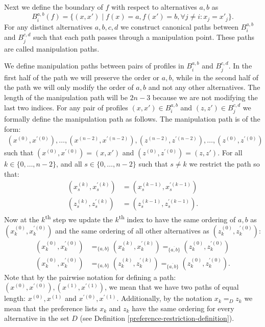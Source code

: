 	Next we define the boundary of $f$ with respect to alternatives $a, b$ as
	\[
		B^{a,b}_i(f) = \{(x, x') \mid f(x) = a, f(x') = b, \forall j \neq i: x_j = x'_j\}.
	\]
	For any distinct alternatives $a, b, c, d$ we construct canonical paths between $B^{a,b}_i$ and $B^{c,d}_j$ such that each path passes through a manipulation point. These paths are called manipulation paths.

	We define manipulation paths between pairs of profiles in $B^{a,b}_i$ and $B^{c,d}_j$. In the first half of the path we will preserve the order or $a, b$, while in the second half of the path we will only modify the order of $a, b$ and not any other alternatives. The length of the manipulation path will be $2n - 3$ because we are not modifying the last two indices. For any pair of profiles $(x, x') \in B^{a,b}_i$ and $(z, z') \in B^{c,d}_j$ we formally define the manipulation path as follows. The manipulation path is of the form:
	\begin{align*}
		(x^{(0)}, x^{\prime(0)}), \ldots, (x^{(n - 2)}, x^{\prime(n - 2)}), (z^{(n - 2)}, z^{\prime(n - 2)}), \ldots, (z^{(0)}, z^{\prime(0)})
	\end{align*}
	such that $(x^{(0)}, x^{\prime(0)}) = (x, x')$ and $(z^{(0)}, z^{\prime(0)}) = (z, z')$. For all $k \in \{0, \ldots, n - 2\}$, and all $s \in \{0, \ldots, n - 2\}$ such that $s \neq k$ we restrict the path so that:
	\begin{align}
		(x_s^{(k)}, x_s^{\prime(k)}) &= (x_s^{(k-1)}, x_s^{\prime(k-1)}) \label{eq:manipulation-path-rule-1-x} \\
		(z_s^{(k)}, z_s^{\prime(k)}) &= (z_s^{(k-1)}, z_s^{\prime(k-1)}). \label{eq:manipulation-path-rule-1-z}
	\end{align}
	Now at the $k$\textsuperscript{th} step we update the $k$\textsuperscript{th} index to have the same ordering of $a, b$ as $(x_k^{(0)}, x_k^{\prime(0)})$ and the same ordering of all other alternatives as $(z_k^{(0)}, z_k^{\prime(0)})$:
	\begin{align}
		(x_k^{(0)}, x_k^{\prime(0)}) &=_{\{a, b\}} (x_k^{(k)}, x_k^{\prime(k)}) =_{\overline{\{a, b\}}} (z_k^{(0)}, z_k^{\prime(0)}) \label{eq:manipulation-path-rule-2-x} \\
		(x_k^{(0)}, x_k^{\prime(0)}) &=_{\{a, b\}} (z_k^{(k)}, z_k^{\prime(k)}) =_{\overline{\{a, b\}}} (z_k^{(0)}, z_k^{\prime(0)}). \label{eq:manipulation-path-rule-2-z}
	\end{align}
	Note that by the pairwise notation for defining a path: $(x^{(0)}, x^{\prime(0)}), (x^{(1)}, x^{\prime(1)})$, we mean that we have two paths of equal length: $x^{(0)}, x^{(1)}$ and $x^{\prime(0)}, x^{\prime(1)}$. Additionally, by the notation $x_k =_D z_k$ we mean that the preference lists $x_k$ and $z_k$ have the same ordering for every alternative in the set $D$ (see Definition \ref{preference-restriction-definition}).

